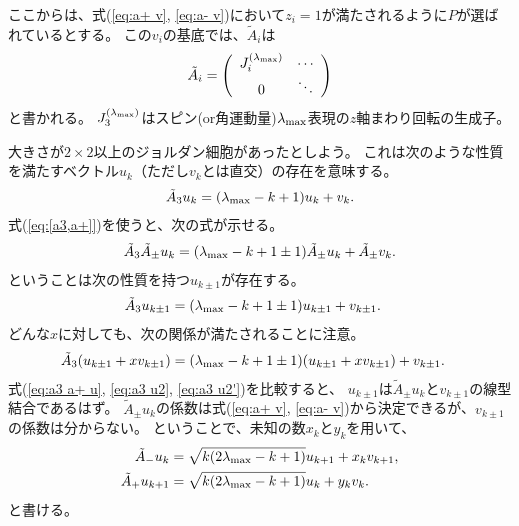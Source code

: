 \documentclass[10pt,a4paper]{jarticle}
\begin{document}
%
ここからは、式(\ref{eq:a+ v}, \ref{eq:a- v})において$z_i=1$が満たされるように$P$が選ばれているとする。
この$v_i$の基底では、$\tilde A_i$は
\begin{align}
\tilde A_i = \left(\begin{array}{cc}
J_i^{(\lambda_{\rm max})} & \cdots \\
0 & \ddots
\end{array}\right)
\end{align}
と書かれる。
$J_3^{(\lambda_{\rm max})}$はスピン(or角運動量)$\lambda_{\rm max}$表現の$z$軸まわり回転の生成子。


大きさが$2\times 2$以上のジョルダン細胞があったとしよう。
これは次のような性質を満たすベクトル$u_k$（ただし$v_k$とは直交）の存在を意味する。
\begin{align}
\tilde A_3 u_k = (\lambda_{\rm max} - k + 1) u_k + v_k. \label{eq:a3 u1}
\end{align}
%
式(\ref{eq:[a3,a+]})を使うと、次の式が示せる。
\begin{align}
\tilde A_3 \tilde A_\pm u_k = (\lambda_{\rm max} - k + 1 \pm 1) \tilde A_{\pm} u_k + \tilde A_{\pm} v_k. \label{eq:a3 a+ u}
\end{align}
%
ということは次の性質を持つ$u_{k\pm 1}$が存在する。
\begin{align}
\tilde A_3 u_{k\pm 1} &= (\lambda_{\rm max} - k + 1 \pm 1) u_{k \pm 1} + v_{k \pm 1}. \label{eq:a3 u2} 
\end{align}
%
どんな$x$に対しても、次の関係が満たされることに注意。
\begin{align}
\tilde A_3 (u_{k\pm 1} + x v_{k\pm 1}) &= (\lambda_{\rm max} - k + 1 \pm 1) (u_{k \pm 1} + x v_{k\pm 1}) + v_{k \pm 1}. \label{eq:a3 u2'} 
\end{align}
%
式(\ref{eq:a3 a+ u}, \ref{eq:a3 u2}, \ref{eq:a3 u2'})を比較すると、
$u_{k\pm 1}$は$\tilde A_\pm u_k$と$v_{k \pm 1}$の線型結合であるはず。
$\tilde A_\pm u_k$の係数は式(\ref{eq:a+ v}, \ref{eq:a- v})から決定できるが、$v_{k\pm 1}$の係数は分からない。
ということで、未知の数$x_k$と$y_k$を用いて、
\begin{align}
\tilde A_- u_k &= \sqrt{k(2\lambda_{\rm max} - k +1) } u_{k+1} + x_k v_{k+1}, \label{eq:a- u}\\
\tilde A_+ u_{k+1} &= \sqrt{k(2\lambda_{\rm max} - k +1) } u_k + y_k v_k.\label{eq:a+ u}
\end{align}
と書ける。
\end{document}
